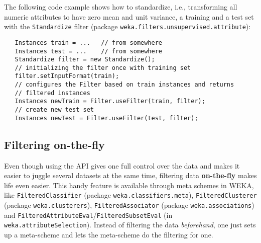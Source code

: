 The following code example shows how to standardize, i.e., transforming all
numeric attributes to have zero mean and unit variance, a training and a test
set with the \texttt{Standardize} filter (package
\texttt{weka.filters.unsupervised.attribute}):
\begin{verbatim}
   Instances train = ...   // from somewhere
   Instances test = ...    // from somewhere
   Standardize filter = new Standardize();
   // initializing the filter once with training set
   filter.setInputFormat(train);
   // configures the Filter based on train instances and returns
   // filtered instances
   Instances newTrain = Filter.useFilter(train, filter);
   // create new test set
   Instances newTest = Filter.useFilter(test, filter);
\end{verbatim}

\newpage

\subsection{Filtering on-the-fly}
\label{api_filtering_onthefly}
Even though using the API gives one full control over the data and makes it
easier to juggle several datasets at the same time, filtering data
\textbf{on-the-fly} makes life even easier. This handy feature is available
through meta schemes in WEKA, like \texttt{FilteredClassifier} (package
\texttt{weka.classifiers.meta}), \texttt{FilteredClusterer} (package
\texttt{weka.clusterers}), \texttt{FilteredAssociator} (package
\texttt{weka.associations}) and
\texttt{FilteredAttributeEval}/\texttt{FilteredSubsetEval} (in
\texttt{weka.attributeSelection}). Instead of filtering the data
\textit{beforehand}, one just sets up a meta-scheme and lets the meta-scheme
do the filtering for one.


